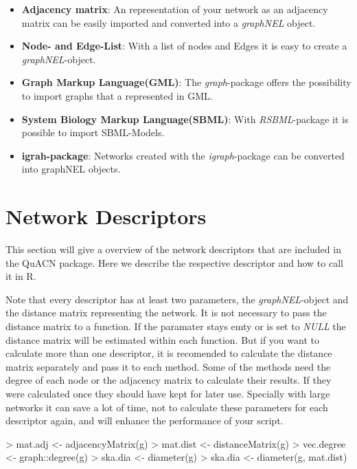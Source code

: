 \documentclass[a4paper]{article}
\begin{document}
\begin{itemize}
\item \textbf{Adjacency matrix}: An representation of your network as an adjacency matrix can be easily imported and converted into a \textit{graphNEL} object.
\item \textbf{Node- and Edge-List}: With a list of nodes and Edges it is easy to create a \textit{graphNEL}-object.
\item \textbf{Graph Markup Language(GML)}: The \textit{graph}-package offers the possibility to import graphs that a represented in GML.
\item \textbf{System Biology Markup Language(SBML)}: With \textit{RSBML}-package it is possible to import SBML-Models.
\item \textbf{igrah-package}: Networks created with the \textit{igraph}-package can be converted into graphNEL objects.
\end{itemize}

\section{Network Descriptors}
\label{sec:desc}
This section will give a overview of the network descriptors \cite{bonchev_book_2005,dehmer_varmuza_2009,dehmer_plos1_2009,todeschini_2002} that are included in the QuACN package. Here we describe the respective descriptor and how to call it in R.

Note that every descriptor has at least two parameters, the \textit{graphNEL}-object and the distance matrix representing the network. It is not necessary to pass the distance matrix to a function. If the paramater stays emty or is set to \textit{NULL} the distance matrix will be estimated within each function. But if you want to calculate more than one descriptor, it is recomended to calculate the distance matrix separately and pass it to each method. Some of the methods need the degree of each node or the adjacency matrix to calculate their results. If they were calculated once they should have kept for later use. Specially with large networks it can save a lot of time, not to calculate these parameters for each descriptor again, and will enhance the performance of your script.
\begin{Schunk}
\begin{Sinput}
> mat.adj <- adjacencyMatrix(g)
> mat.dist <- distanceMatrix(g)
> vec.degree <- graph::degree(g)
> ska.dia <- diameter(g)
> ska.dia <- diameter(g, mat.dist)
\end{Sinput}
\end{Schunk}
\end{document}
